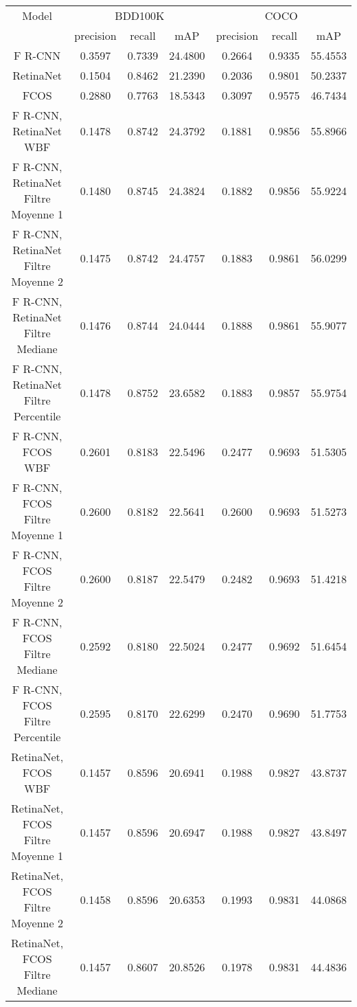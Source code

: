\documentclass{article}
\begin{document}
\begin{table}[h!]
\centering
\begin{tabular}{|c||c|c|c||c|c|c|} 
\hline
Model & \multicolumn{3}{|c||}{BDD100K} & \multicolumn{3}{|c|}{COCO} \\ 
 & precision & recall & mAP  & precision & recall & mAP  \\ [0.5ex] 
\hline
F R-CNN & 0.3597 & 0.7339 & 24.4800 & 0.2664 & 0.9335 & 55.4553 \\ 
\hline
RetinaNet & 0.1504 & 0.8462 & 21.2390 & 0.2036 & 0.9801 & 50.2337 \\ 
\hline
FCOS & 0.2880 & 0.7763 & 18.5343 & 0.3097 & 0.9575 & 46.7434 \\ 
\hline
F R-CNN, RetinaNet WBF & 0.1478 & 0.8742 & 24.3792 & 0.1881 & 0.9856 & 55.8966 \\ 
\hline
F R-CNN, RetinaNet Filtre Moyenne 1 & 0.1480 & 0.8745 & 24.3824 & 0.1882 & 0.9856 & 55.9224 \\ 
\hline
F R-CNN, RetinaNet Filtre Moyenne 2 & 0.1475 & 0.8742 & 24.4757 & 0.1883 & 0.9861 & 56.0299 \\ 
\hline
F R-CNN, RetinaNet Filtre Mediane & 0.1476 & 0.8744 & 24.0444 & 0.1888 & 0.9861 & 55.9077 \\ 
\hline
F R-CNN, RetinaNet Filtre Percentile & 0.1478 & 0.8752 & 23.6582 & 0.1883 & 0.9857 & 55.9754 \\ 
\hline
F R-CNN, FCOS WBF & 0.2601 & 0.8183 & 22.5496 & 0.2477 & 0.9693 & 51.5305 \\ 
\hline
F R-CNN, FCOS Filtre Moyenne 1 & 0.2600 & 0.8182 & 22.5641 & 0.2600 & 0.9693 & 51.5273 \\ 
\hline
F R-CNN, FCOS Filtre Moyenne 2 & 0.2600 & 0.8187 & 22.5479 & 0.2482 & 0.9693 & 51.4218 \\ 
\hline
F R-CNN, FCOS Filtre Mediane & 0.2592 & 0.8180 & 22.5024 & 0.2477 & 0.9692 & 51.6454 \\ 
\hline
F R-CNN, FCOS Filtre Percentile & 0.2595 & 0.8170 & 22.6299 & 0.2470 & 0.9690 & 51.7753 \\ 
\hline
RetinaNet, FCOS WBF & 0.1457 & 0.8596 & 20.6941 & 0.1988 & 0.9827 & 43.8737 \\ 
\hline
RetinaNet, FCOS Filtre Moyenne 1 & 0.1457 & 0.8596 & 20.6947 & 0.1988 & 0.9827 & 43.8497 \\ 
\hline
RetinaNet, FCOS Filtre Moyenne 2 & 0.1458 & 0.8596 & 20.6353 & 0.1993 & 0.9831 & 44.0868 \\ 
\hline
RetinaNet, FCOS Filtre Mediane & 0.1457 & 0.8607 & 20.8526 & 0.1978 & 0.9831 & 44.4836 \\ 

\end{tabular}
\end{table}
\end{document}
